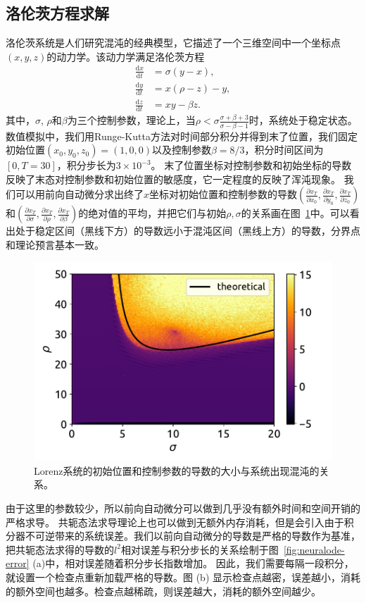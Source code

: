 \documentclass[A4,twoside,fontset=ubuntu,UTF8]{ctexart}
\def\D{\mathrm{d}}
\begin{document}
\subsection{洛伦茨方程求解}
洛伦茨系统是人们研究混沌的经典模型，它描述了一个三维空间中一个坐标点$(x,y,z)$的动力学。该动力学满足洛伦茨方程
\begin{align*}
    \frac{\D x}{\D t} &= \sigma(y - x),\\
    \frac{\D y}{\D t} &= x(\rho -z) - y,\\
    \frac{\D z}{\D t} &= xy-\beta z.
\end{align*}
其中，$\sigma$, $\rho$和$\beta$为三个控制参数，理论上，当$\rho < \sigma \frac{\sigma + \beta + 3}{\sigma - \beta - 1}$时，系统处于稳定状态。数值模拟中，我们用Runge-Kutta方法对时间部分积分并得到末了位置，我们固定初始位置$(x_0,y_0,z_0) = (1, 0, 0)$以及控制参数$\beta=8/3$，积分时间区间为$[0,T=30]$，积分步长为$3\times 10^{-3}$。
末了位置坐标对控制参数和初始坐标的导数反映了末态对控制参数和初始位置的敏感度，它一定程度的反映了浑沌现象。
我们可以用前向自动微分求出终了$x$坐标对初始位置和控制参数的导数$(\frac{\partial x_T}{\partial x_0}, \frac{\partial x_T}{\partial y_0}, \frac{\partial x_T}{\partial z_0})$和$(\frac{\partial x_T}{\partial\sigma}, \frac{\partial x_T}{\partial\rho}, \frac{\partial x_T}{\partial\beta})$的绝对值的平均，并把它们与初始$\rho,\sigma$的关系画在图~\ref{fig:chaos}中。可以看出处于稳定区间（黑线下方）的导数远小于混沌区间（黑线上方）的导数，分界点和理论预言基本一致。

\begin{figure}[t]
\centering
\includegraphics[width=0.6\columnwidth]{./fig4.pdf}
    \caption{Lorenz系统的初始位置和控制参数的导数的大小与系统出现混沌的关系。\label{fig:chaos}} 
\end{figure}

由于这里的参数较少，所以前向自动微分可以做到几乎没有额外时间和空间开销的严格求导。
共轭态法求导理论上也可以做到无额外内存消耗，但是会引入由于积分器不可逆带来的系统误差。我们以前向自动微分的导数是严格的导数作为基准，把共轭态法求得的导数的$l^2$相对误差与积分步长的关系绘制于图~\ref{fig:neuralode-error} (a)中，相对误差随着积分步长指数增加。
因此，我们需要每隔一段积分，就设置一个检查点重新加载严格的导数。图 (b) 显示检查点越密，误差越小，消耗的额外空间也越多。检查点越稀疏，则误差越大，消耗的额外空间越少。
\end{document}
